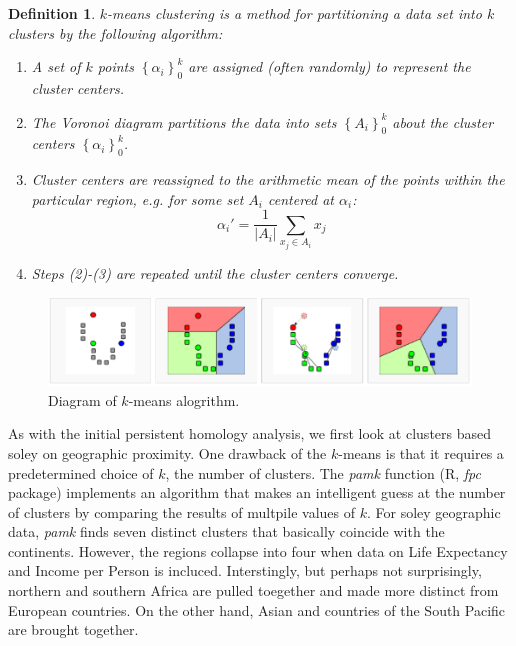 \documentclass[11pt]{amsart}
\newtheorem{defn} [equation]{Definition}
\theoremstyle{remark}	  \newtheorem*{remark}{Remark}
\newcommand{\set}[1]{\left\{#1\right\}}
\numberwithin{equation}{section}
\begin{document}
\begin{defn}
  \emph{$k$-means clustering} is a method for partitioning a data set into $k$ clusters by the following algorithm:
  \begin{enumerate}
  \item A set of $k$ points $\set{\alpha_i}_0^k$ are assigned (often randomly) to represent the cluster centers.
  \item The Voronoi diagram partitions the data into sets $\set{A_i}_0^k$ about the cluster centers $\set{\alpha_i}_0^k$.
  \item Cluster centers are reassigned to the arithmetic mean of the points within the particular region, e.g. for some set $A_i$ centered at $\alpha_i$: 
\[ \alpha_i' = \frac{1}{|A_i|}\sum_{x_j \in A_i} x_j \]
  \item Steps (2)-(3) are repeated until the cluster centers converge. 
  \end{enumerate}

\end{defn}

\begin{figure}
  \centering
  \includegraphics[width=\linewidth]{kmeans.png}
  \caption{Diagram of $k$-means alogrithm. \cite{wikimedia}}
  \label{fig:kmeans}
\end{figure}

As with the initial persistent homology analysis, we first look at clusters based soley on geographic proximity. One drawback of the $k$-means is that it requires a predetermined choice of $k$, the number of clusters. The \emph{pamk} function (R, \emph{fpc} package) implements an algorithm that makes an intelligent guess at the number of clusters by comparing the results of multpile values of $k$. For soley geographic data, \emph{pamk} finds seven distinct clusters that basically coincide with the continents. However, the regions collapse into four when data on Life Expectancy and Income per Person is incluced. Interstingly, but perhaps not surprisingly, northern and southern Africa are pulled toegether and made more distinct from European countries. On the other hand, Asian and countries of the South Pacific are brought together. 
\end{document}
